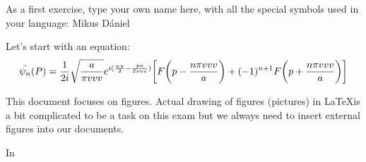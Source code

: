 \documentclass[12pt]{article}
\begin{document}
\par
As a first exercise, type your own name here, with all the special symbols used in your language: Mikus Dániel \par
Let's start with an equation:
\begin{equation}
    \Bar{\psi _n} (P) = \frac{1}{2i} \sqrt{\frac{a}{\pi vvv}} e^{i(\frac{n \pi}{2} - \frac{pa}{2 vvv})} \bigg[ F \bigg(p - \frac{n \pi vvv}{a}\bigg) + (-1)^{n+1} F \bigg(p + \frac{n \pi vvv}{a}\bigg) \bigg]
\end{equation}
\par
This document focuses on figures. Actual drawing of figures (pictures) in \LaTeX is a bit complicated to be a task on this exam but we always need to insert external figures into our documents.\par
In 
\end{document}
